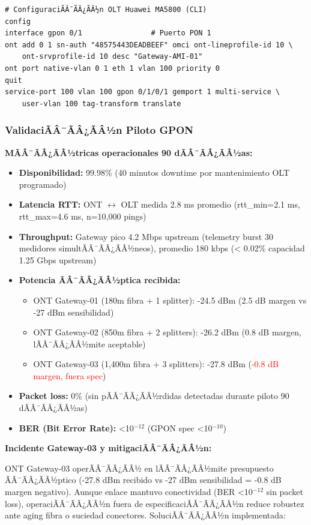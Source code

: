 \begin{verbatim}
# ConfiguraciÃÂ¯ÃÂ¿ÃÂ½n OLT Huawei MA5800 (CLI)
config
interface gpon 0/1                # Puerto PON 1
ont add 0 1 sn-auth "48575443DEADBEEF" omci ont-lineprofile-id 10 \
    ont-srvprofile-id 10 desc "Gateway-AMI-01"
ont port native-vlan 0 1 eth 1 vlan 100 priority 0
quit
service-port 100 vlan 100 gpon 0/1/0/1 gemport 1 multi-service \
    user-vlan 100 tag-transform translate
\end{verbatim}

\subsubsection{ValidaciÃÂ¯ÃÂ¿ÃÂ½n Piloto GPON}

\textbf{MÃÂ¯ÃÂ¿ÃÂ½tricas operacionales 90 dÃÂ¯ÃÂ¿ÃÂ½as:}

\begin{itemize}
    \item \textbf{Disponibilidad:} 99.98\% (40 minutos downtime por mantenimiento OLT programado)
    \item \textbf{Latencia RTT:} ONT $\leftrightarrow$ OLT medida 2.8 ms promedio (rtt\_min=2.1 ms, rtt\_max=4.6 ms, n=10,000 pings)
    \item \textbf{Throughput:} Gateway pico 4.2 Mbps upstream (telemetry burst 30 medidores simultÃÂ¯ÃÂ¿ÃÂ½neos), promedio 180 kbps (< 0.02\% capacidad 1.25 Gbps upstream)
    \item \textbf{Potencia ÃÂ¯ÃÂ¿ÃÂ½ptica recibida:} 
    \begin{itemize}
        \item ONT Gateway-01 (180m fibra + 1 splitter): -24.5 dBm (2.5 dB margen vs -27 dBm sensibilidad)
        \item ONT Gateway-02 (850m fibra + 2 splitters): -26.2 dBm (0.8 dB margen, lÃÂ¯ÃÂ¿ÃÂ½mite aceptable)
        \item ONT Gateway-03 (1,400m fibra + 3 splitters): -27.8 dBm (\textcolor{red}{-0.8 dB margen, fuera spec})
    \end{itemize}
    \item \textbf{Packet loss:} 0\% (sin pÃÂ¯ÃÂ¿ÃÂ½rdidas detectadas durante piloto 90 dÃÂ¯ÃÂ¿ÃÂ½as)
    \item \textbf{BER (Bit Error Rate):} <10$^{-12}$ (GPON spec <10$^{-10}$)
\end{itemize}

\textbf{Incidente Gateway-03 y mitigaciÃÂ¯ÃÂ¿ÃÂ½n:}

ONT Gateway-03 operÃÂ¯ÃÂ¿ÃÂ½ en lÃÂ¯ÃÂ¿ÃÂ½mite presupuesto ÃÂ¯ÃÂ¿ÃÂ½ptico (-27.8 dBm recibido vs -27 dBm sensibilidad = -0.8 dB margen negativo). Aunque enlace mantuvo conectividad (BER <10$^{-12}$ sin packet loss), operaciÃÂ¯ÃÂ¿ÃÂ½n fuera de especificaciÃÂ¯ÃÂ¿ÃÂ½n reduce robustez ante aging fibra o suciedad conectores. SoluciÃÂ¯ÃÂ¿ÃÂ½n implementada:


